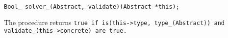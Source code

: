 
\tt{Bool_ solver_(Abstract, validate)(Abstract *this);}


The procedure returns \tt{true} if \tt{is(this->type, type_(Abstract))}
and \tt{validate_(this->concrete)} are \tt{true}.
